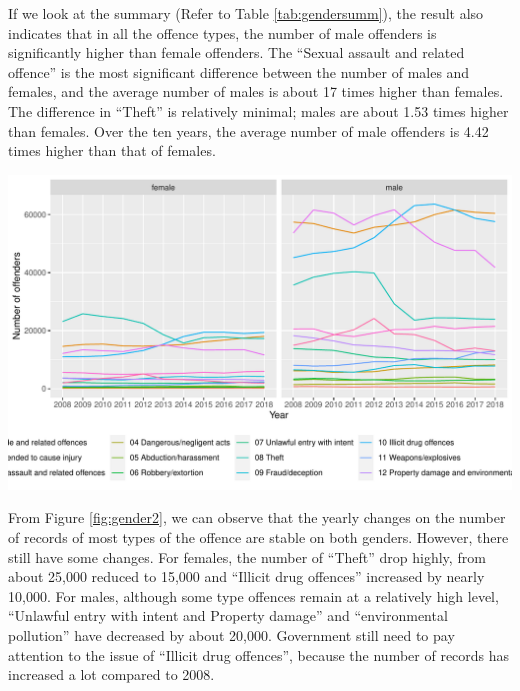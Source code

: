 \documentclass[11pt,a4paper,]{article}
\let\origfigure\figure
\let\endorigfigure\endfigure
\renewenvironment{figure}[1][2] {
\expandafter\origfigure\expandafter[H]
} {
\endorigfigure
}
\begin{document}
If we look at the summary (Refer to Table \ref{tab:gendersumm}), the result also indicates that in all the offence types, the number of male offenders is significantly higher than female offenders. The ``Sexual assault and related offence'' is the most significant difference between the number of males and females, and the average number of males is about 17 times higher than females. The difference in ``Theft'' is relatively minimal; males are about 1.53 times higher than females. Over the ten years, the average number of male offenders is 4.42 times higher than that of females.

\begin{figure}
\centering
\includegraphics{ETC5513-Assignment4_files/figure-latex/gender2-1.pdf}
\caption{\label{fig:gender2}Yearly Number of Offenders on Female and Male}
\end{figure}

From Figure \ref{fig:gender2}, we can observe that the yearly changes on the number of records of most types of the offence are stable on both genders. However, there still have some changes. For females, the number of ``Theft'' drop highly, from about 25,000 reduced to 15,000 and ``Illicit drug offences'' increased by nearly 10,000. For males, although some type offences remain at a relatively high level, ``Unlawful entry with intent and Property damage'' and ``environmental pollution'' have decreased by about 20,000. Government still need to pay attention to the issue of ``Illicit drug offences'', because the number of records has increased a lot compared to 2008.
\end{document}
